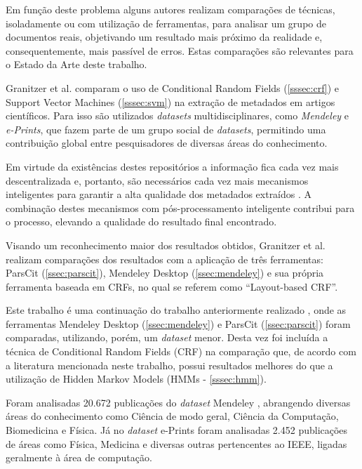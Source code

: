 Em função deste problema alguns autores realizam comparações de técnicas, isoladamente ou com utilização de ferramentas, para analisar um grupo de documentos reais, objetivando um resultado mais próximo da realidade e, consequentemente, mais passível de erros. Estas comparações são relevantes para o Estado da Arte deste trabalho.

Granitzer et al. \cite{Granitzer-2012-LayoutBased} comparam o uso de Conditional Random Fields (\autoref{sssec:crf}) e Support Vector Machines (\autoref{sssec:svm}) na extração de metadados em artigos científicos. Para isso são utilizados \emph{datasets} multidisciplinares, como \emph{Mendeley} e \emph{e-Prints}, que fazem parte de um grupo social de \emph{datasets}, permitindo uma contribuição global entre pesquisadores de diversas áreas do conhecimento.

Em virtude da existências destes repositórios a informação fica cada vez mais descentralizada e, portanto, são necessários cada vez mais mecanismos inteligentes para garantir a alta qualidade dos metadados extraídos \cite{Granitzer-2012-LayoutBased}. A combinação destes mecanismos com pós-processamento inteligente contribui para o processo, elevando a qualidade do resultado final encontrado.


Visando um reconhecimento maior dos resultados obtidos, Granitzer et al. realizam comparações dos resultados com a aplicação de três ferramentas: ParsCit (\autoref{ssec:parscit}), Mendeley Desktop (\autoref{ssec:mendeley}) e sua própria ferramenta baseada em CRFs, no qual se referem como ``Layout-based CRF''.

Este trabalho \cite{Granitzer-2012-LayoutBased} é uma continuação do trabalho anteriormente realizado \cite{Granitzer-2012-Crowdsourced}, onde as ferramentas Mendeley Desktop (\autoref{ssec:mendeley}) e ParsCit (\autoref{ssec:parscit}) foram comparadas, utilizando, porém, um \emph{dataset} menor. Desta vez foi incluída a técnica de Conditional Random Fields (CRF) na comparação que, de acordo com a literatura mencionada neste trabalho, possui resultados melhores do que a utilização de Hidden Markov Models (HMMs - \autoref{sssec:hmm}).

Foram analisadas 20.672 publicações do \emph{dataset} Mendeley \cite{Granitzer-2012-LayoutBased}, abrangendo diversas áreas do conhecimento como Ciência de modo geral, Ciência da Computação, Biomedicina e Física. Já no \emph{dataset} e-Prints foram analisadas 2.452 publicações de áreas como Física, Medicina e diversas outras pertencentes ao IEEE, ligadas geralmente à área de computação.

